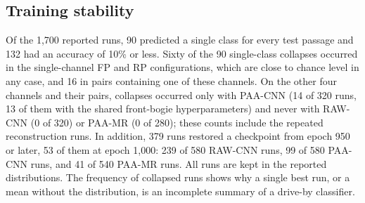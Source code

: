 \subsection{Training stability}
\label{sec:stability}

Of the 1,700 reported runs, 90 predicted a single class for every test passage
and 132 had an accuracy of 10\% or less. Sixty of the 90 single-class collapses
occurred in the single-channel FP and RP configurations, which are close to
chance level in any case, and 16 in pairs containing one of these channels. On
the other four channels and their pairs, collapses occurred only with
PAA-CNN (14 of 320 runs, 13 of them with the shared front-bogie
hyperparameters) and never with RAW-CNN (0 of 320) or PAA-MR (0 of 280); these
counts include the repeated reconstruction runs. In addition, 379 runs restored
a checkpoint from epoch 950 or later, 53 of them at epoch 1,000: 239 of 580
RAW-CNN runs, 99 of 580 PAA-CNN runs, and 41 of 540 PAA-MR runs. All runs are
kept in the reported distributions. The frequency of collapsed runs shows why a
single best run, or a mean without the distribution, is an incomplete summary
of a drive-by classifier.
